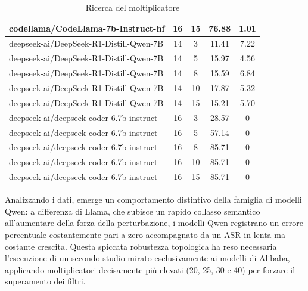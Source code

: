 \begin{table}[H]
{\begin{tabular}{l c c c c}
        codellama/CodeLlama-7b-Instruct-hf       & 16 & 15 & 76.88  & 1.01 \\
        \midrule
        deepseek-ai/DeepSeek-R1-Distill-Qwen-7B  & 14  & 3 & 11.41  & 7.22 \\
        deepseek-ai/DeepSeek-R1-Distill-Qwen-7B  & 14  & 5 & 15.97  & 4.56 \\
        deepseek-ai/DeepSeek-R1-Distill-Qwen-7B  & 14  & 8 & 15.59  & 6.84 \\
        deepseek-ai/DeepSeek-R1-Distill-Qwen-7B  & 14  & 10 & 17.87  & 5.32 \\
        deepseek-ai/DeepSeek-R1-Distill-Qwen-7B  & 14  & 15 & 15.21  & 5.70 \\
        \midrule
        deepseek-ai/deepseek-coder-6.7b-instruct & 16  & 3 & 28.57  & 0 \\
        deepseek-ai/deepseek-coder-6.7b-instruct & 16  & 5 & 57.14  & 0 \\
        deepseek-ai/deepseek-coder-6.7b-instruct & 16  & 8 & 85.71  & 0 \\
        deepseek-ai/deepseek-coder-6.7b-instruct & 16  & 10 & 85.71  & 0 \\
        deepseek-ai/deepseek-coder-6.7b-instruct & 16  & 15 & 85.71  & 0 \\
        \bottomrule
    \end{tabular}
    }
    \vspace{0.2cm}
    \caption{Ricerca del moltiplicatore}
    \label{tab:valutazione_moltiplicatore}
\end{table}

Analizzando i dati, emerge un comportamento distintivo della famiglia di modelli Qwen: a differenza di Llama, che subisce un rapido collasso semantico all'aumentare della forza della perturbazione, i modelli Qwen registrano un errore percentuale costantemente pari a zero accompagnato da un ASR in lenta ma costante crescita. Questa spiccata robustezza topologica ha reso necessaria l'esecuzione di un secondo studio mirato esclusivamente ai modelli di Alibaba, applicando moltiplicatori decisamente più elevati (20, 25, 30 e 40) per forzare il superamento dei filtri.

